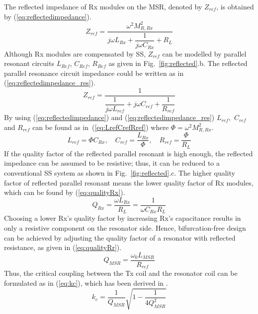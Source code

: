 \documentclass[journal]{IEEEtran}
\begin{document}
The reflected impedance of  Rx modules on the MSR, denoted by $Z_{ref}$, is obtained by (\ref{eq:reflectedimpedance}).
\begin{equation}
Z_{ref}=\frac{\omega^2M_{R,Rx}^2}{j\omega L_{Rx}+\dfrac{1}{j\omega C_{Rx}}+R_{L}}
    \label{eq:reflectedimpedance}
\end{equation}
Although Rx modules are compensated by SS, $Z_{ref}$ can be modelled by parallel resonant circuits $L_{Ref}$, $C_{Ref}$, $R_{Ref}$ as given in Fig.~\ref{fig:reflected}.b.
The reflected parallel resonance circuit impedance could be written as in (\ref{eq:reflectedimpedance_res}).
 \begin{equation}   
    Z_{ref}=\frac{1}{\dfrac{1}{j\omega L_{ref}}+j\omega C_{ref}+\dfrac{1}{R_{ref}}}
      \label{eq:reflectedimpedance_res}
\end{equation} 
By using (\ref{eq:reflectedimpedance}) and (\ref{eq:reflectedimpedance_res}) $L_{ref}, $ $ C_{ref}$ and $R_{ref}$ can be found as in~(\ref{eq:LrefCrefRref}) where $\Phi=\omega^2M_{R,Rx}^2$.
 \begin{equation}   
   L_{ref}= \Phi C_{Rx}, \quad C_{ref}=\frac{L_{Rx}}{\Phi}, \quad  R_{ref}=\frac{\Phi}{R_L}
      \label{eq:LrefCrefRref}
\end{equation}  
If the quality factor of the reflected parallel resonant is high enough, the reflected impedance can be assumed to be resistive; thus, it can be reduced to a conventional SS system as shown in Fig.~\ref{fig:reflected}.c. 
The higher quality factor of reflected parallel resonant means the lower quality factor of Rx modules, which can be found by (\ref{eq:qualityRx}). 
\begin{equation}
Q_{Rx}=\frac{\omega L_{Rx}}{R_{L}}=\frac{1}{\omega C_{Rx}R_{L}}
    \label{eq:qualityRx}
\end{equation}
Choosing a lower Rx's quality factor by increasing Rx's capacitance results in only a resistive component on the resonator side. 
Hence, bifurcation-free design can be achieved by adjusting the quality factor of a resonator with reflected resistance, as given in (\ref{eq:qualityRr}).
\begin{equation}
Q_{MSR}=\frac{\omega_0 L_{MSR}}{R_{ref}}
    \label{eq:qualityRr}
\end{equation}
Thus, the critical coupling between the Tx coil and the resonator coil can be formulated as in (\ref{eq:kc}), which has been derived in \cite{Aditya2019,polat_2021}.
  \begin{equation}
  k_c=\frac{1}{Q_{MSR}}\sqrt{1-\frac{1}{4Q_{MSR}^2}}
      \label{eq:kc}
  \end{equation}
\end{document}
